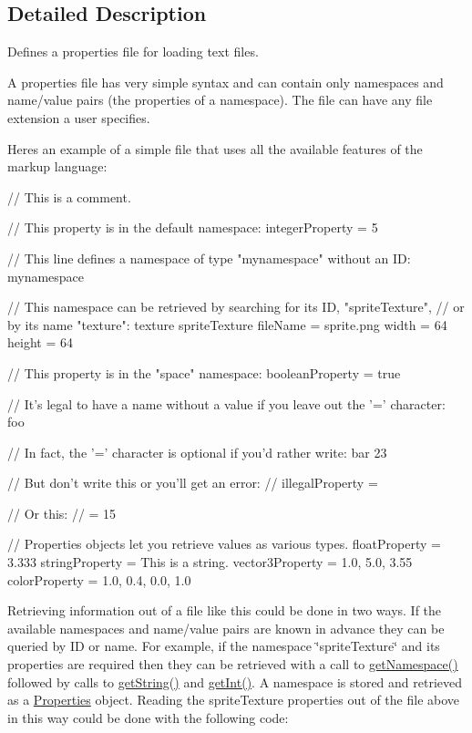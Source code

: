 \subsection{Detailed Description}
Defines a properties file for loading text files.

A properties file has very simple syntax and can contain only namespaces and name/value pairs (the properties of a namespace). The file can have any file extension a user specifies.

Here\textquotesingle{}s an example of a simple file that uses all the available features of the markup language\+:

\begin{DoxyVerb}   // This is a comment.

   // This property is in the default namespace:
   integerProperty = 5

   // This line defines a namespace of type "mynamespace" without an ID:
   mynamespace
   {
       // This namespace can be retrieved by searching for its ID, "spriteTexture",
       // or by its name "texture":
       texture spriteTexture 
       {
           fileName = sprite.png
           width = 64
           height = 64
       }

       // This property is in the "space" namespace:
       booleanProperty = true

       // It's legal to have a name without a value if you leave out the '=' character:
       foo

       // In fact, the '=' character is optional if you'd rather write:
       bar 23

       // But don't write this or you'll get an error:
       // illegalProperty =

       // Or this:
       // = 15

       // Properties objects let you retrieve values as various types.
       floatProperty = 3.333
       stringProperty = This is a string.
       vector3Property = 1.0, 5.0, 3.55
       colorProperty = 1.0, 0.4, 0.0, 1.0
   }
\end{DoxyVerb}


Retrieving information out of a file like this could be done in two ways. If the available namespaces and name/value pairs are known in advance they can be queried by ID or name. For example, if the namespace \char`\"{}sprite\+Texture\char`\"{} and its properties are required then they can be retrieved with a call to \hyperlink{classProperties_a477722d07bc4b16275f05f82e443b67e}{get\+Namespace()} followed by calls to \hyperlink{classProperties_adaf74082354288405dba508c7d0fe342}{get\+String()} and \hyperlink{classProperties_abbea452c3b133805fa955a6e1f91d1db}{get\+Int()}. A namespace is stored and retrieved as a \hyperlink{classProperties}{Properties} object. Reading the sprite\+Texture properties out of the file above in this way could be done with the following code\+:

